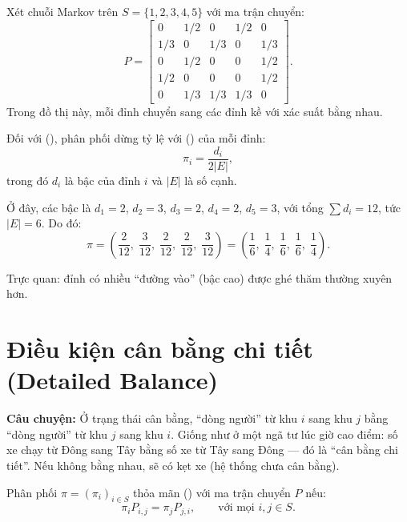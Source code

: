 \begin{example}
\label{ex:cover-graph}
Xét chuỗi Markov trên $S = \{1, 2, 3, 4, 5\}$ với ma trận chuyển:
\[
  P = \begin{bmatrix}
    0 & 1/2 & 0 & 1/2 & 0 \\
    1/3 & 0 & 1/3 & 0 & 1/3 \\
    0 & 1/2 & 0 & 0 & 1/2 \\
    1/2 & 0 & 0 & 0 & 1/2 \\
    0 & 1/3 & 1/3 & 1/3 & 0
  \end{bmatrix}.
\]
Trong đồ thị này, mỗi đỉnh chuyển sang các đỉnh kề với xác suất bằng nhau.

Đối với  (),
phân phối dừng tỷ lệ với  () của mỗi đỉnh:
\[
  \pi_i = \frac{d_i}{2|E|},
\]
trong đó $d_i$ là bậc của đỉnh $i$ và $|E|$ là số cạnh.

Ở đây, các bậc là $d_1 = 2$, $d_2 = 3$, $d_3 = 2$, $d_4 = 2$, $d_5 = 3$,
với tổng $\sum d_i = 12$, tức $|E| = 6$. Do đó:
\[
  \pi = \left(\frac{2}{12},\; \frac{3}{12},\; \frac{2}{12},\; \frac{2}{12},\; \frac{3}{12}\right)
  = \left(\frac{1}{6},\; \frac{1}{4},\; \frac{1}{6},\; \frac{1}{6},\; \frac{1}{4}\right).
\]

Trực quan: đỉnh có nhiều ``đường vào'' (bậc cao) được ghé thăm thường xuyên hơn.
\end{example}

\section{Điều kiện cân bằng chi tiết (Detailed Balance)}
\label{sec:detailed-balance}

\textbf{Câu chuyện:} Ở trạng thái cân bằng, ``dòng người'' từ khu $i$ sang khu $j$
bằng ``dòng người'' từ khu $j$ sang khu $i$.
Giống như ở một ngã tư lúc giờ cao điểm: số xe chạy từ Đông sang Tây bằng số xe từ Tây sang Đông
--- đó là ``cân bằng chi tiết''. Nếu không bằng nhau, sẽ có kẹt xe (hệ thống chưa cân bằng).

\begin{dinhnghia}
\label{def:detailed-balance}
Phân phối $\pi = (\pi_i)_{i\in S}$ thỏa mãn 
() với ma trận chuyển $P$ nếu:
\begin{equation}\label{eq:detailed-balance}
  \boxed{\pi_i P_{i,j} = \pi_j P_{j,i}, \qquad \text{với mọi } i, j \in S.}
\end{equation}
\end{dinhnghia}

